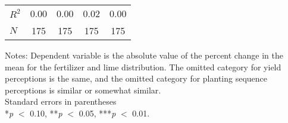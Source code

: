 \begin{table}[htbp]
\begin{threeparttable}
\begin{tabular}{l cccc}
\hline
$R^2$               &        0.00   &        0.00   &        0.02   &        0.00   \\
$N$                 &         175   &         175   &         175   &         175   \\
\hline
\hline
\end{tabular}
\begin{tablenotes}
\footnotesize
\item{Notes: Dependent variable is the absolute value of the percent change in the mean for the fertilizer and lime distribution. The omitted category for yield perceptions is the same, and the omitted category for planting sequence perceptions is similar or somewhat similar. \\ Standard errors in parentheses \\ *\textit{p} $<$ 0.10, **\textit{p} $<$ 0.05, ***\textit{p} $<$ 0.01.}
\end{tablenotes}
\end{threeparttable}
\end{table}
